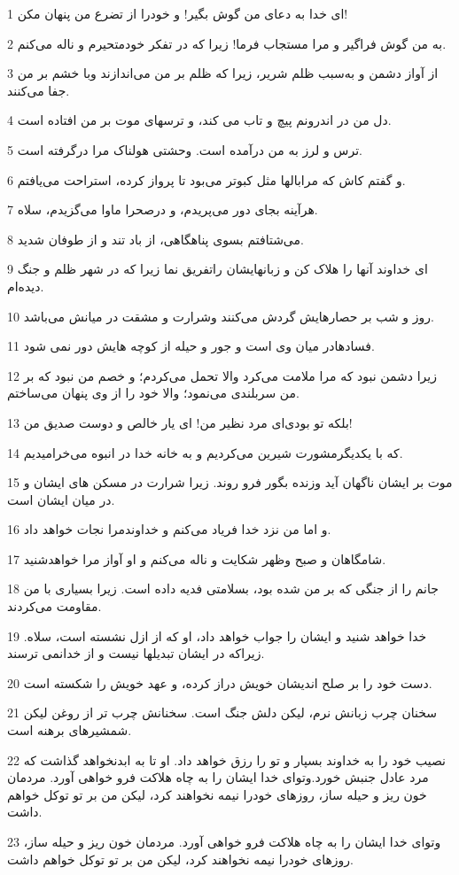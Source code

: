 \par 1 ای خدا به دعای من گوش بگیر! و خودرا از تضرع من پنهان مکن!
\par 2 به من گوش فراگیر و مرا مستجاب فرما! زیرا که در تفکر خودمتحیرم و ناله می‌کنم.
\par 3 از آواز دشمن و به‌سبب ظلم شریر، زیرا که ظلم بر من می‌اندازند وبا خشم بر من جفا می‌کنند.
\par 4 دل من در اندرونم پیچ و تاب می کند، و ترسهای موت بر من افتاده است.
\par 5 ترس و لرز به من در‌آمده است. وحشتی هولناک مرا در‌گرفته است.
\par 6 و گفتم کاش که مرابالها مثل کبوتر می‌بود تا پرواز کرده، استراحت می‌یافتم.
\par 7 هرآینه بجای دور می‌پریدم، و درصحرا ماوا می‌گزیدم، سلاه.
\par 8 می‌شتافتم بسوی پناهگاهی، از باد تند و از طوفان شدید.
\par 9 ‌ای خداوند آنها را هلاک کن و زبانهایشان راتفریق نما زیرا که در شهر ظلم و جنگ دیده‌ام.
\par 10 روز و شب بر حصارهایش گردش می‌کنند وشرارت و مشقت در میانش می‌باشد.
\par 11 فسادهادر میان وی است و جور و حیله از کوچه هایش دور نمی شود.
\par 12 زیرا دشمن نبود که مرا ملامت می‌کرد والا تحمل می‌کردم؛ و خصم من نبود که بر من سربلندی می‌نمود؛ والا خود را از وی پنهان می‌ساختم.
\par 13 بلکه تو بودی‌ای مرد نظیر من! ای یار خالص و دوست صدیق من!
\par 14 که با یکدیگرمشورت شیرین می‌کردیم و به خانه خدا در انبوه می‌خرامیدیم.
\par 15 موت بر ایشان ناگهان آید وزنده بگور فرو روند. زیرا شرارت در مسکن های ایشان و در میان ایشان است.
\par 16 و اما من نزد خدا فریاد می‌کنم و خداوندمرا نجات خواهد داد.
\par 17 شامگاهان و صبح وظهر شکایت و ناله می‌کنم و او آواز مرا خواهدشنید.
\par 18 جانم را از جنگی که بر من شده بود، بسلامتی فدیه داده است. زیرا بسیاری با من مقاومت می‌کردند.
\par 19 خدا خواهد شنید و ایشان را جواب خواهد داد، او که از ازل نشسته است، سلاه. زیراکه در ایشان تبدیلها نیست و از خدانمی ترسند.
\par 20 دست خود را بر صلح اندیشان خویش دراز کرده، و عهد خویش را شکسته است.
\par 21 سخنان چرب زبانش نرم، لیکن دلش جنگ است. سخنانش چرب تر از روغن لیکن شمشیرهای برهنه است.
\par 22 نصیب خود را به خداوند بسپار و تو را رزق خواهد داد. او تا به ابدنخواهد گذاشت که مرد عادل جنبش خورد.وتو‌ای خدا ایشان را به چاه هلاکت فرو خواهی آورد. مردمان خون ریز و حیله ساز، روزهای خودرا نیمه نخواهند کرد، لیکن من بر تو توکل خواهم داشت.
\par 23 وتو‌ای خدا ایشان را به چاه هلاکت فرو خواهی آورد. مردمان خون ریز و حیله ساز، روزهای خودرا نیمه نخواهند کرد، لیکن من بر تو توکل خواهم داشت.
 
